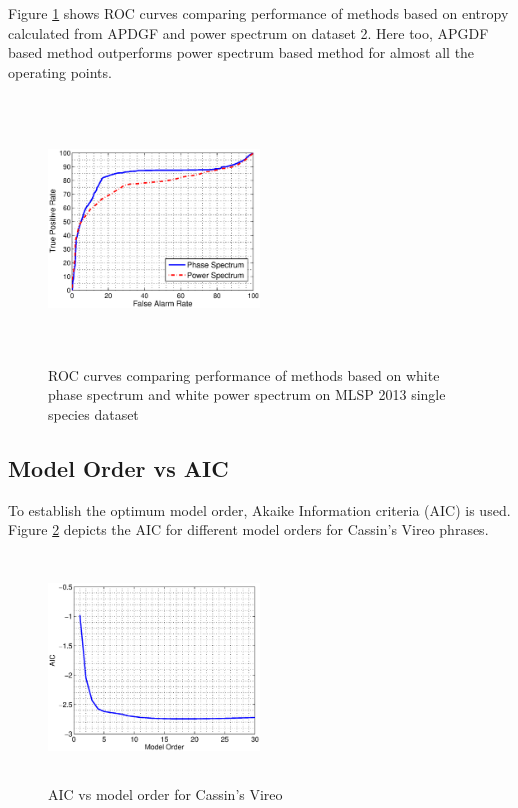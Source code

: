 \documentclass[a4paper]{article}
\begin{document}
 
 
 
 Figure \ref{fig:ROCdata2} shows ROC curves comparing performance of methods based on entropy calculated from APDGF  and power spectrum on dataset 2. Here too, APGDF based method outperforms power spectrum based method for almost all the operating points. 

 
\begin{figure}[!ht]
	\centering
	\includegraphics[width=0.5\textwidth,height=7cm] {gd_2.eps}
	\caption{ROC curves comparing performance of methods based on white phase spectrum and white power spectrum on MLSP 2013 single species dataset }   
	\label{fig:ROCdata2}
\end{figure} 




 \subsection{Model Order  vs AIC}
 
 
 To establish the optimum model order, Akaike Information criteria (AIC)  \cite{makhoul} is used. Figure \ref{fig:AIC_cassins} depicts the AIC for different model orders for Cassin's Vireo phrases.  
 
 
 \begin{figure}[!ht]
	\centering
	\includegraphics[width=0.5\textwidth,height=6cm] {cassins_AIC.eps}
	\caption{AIC vs model order for Cassin's Vireo }   
	\label{fig:AIC_cassins}
\end{figure} 
\end{document}
